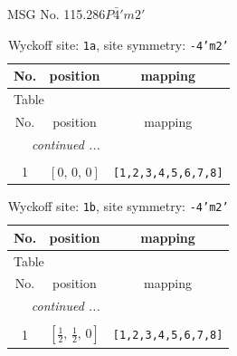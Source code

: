 \documentclass[fleqn,8pt]{jsarticle}
\begin{document}
\setcounter{MaxMatrixCols}{32}

\renewcommand{\tablename}{Table~}
\renewcommand{\figurename}{Figure~}
\begin{center}
\LARGE
MSG No. 115.286\quad$P\bar{4}'m2'$
\end{center}
\renewcommand{\arraystretch}{1.2}
\begin{longtable}{ccc}
\caption{Wyckoff site: {\tt 1a}, site symmetry: {\tt -4'm2'}}
 \\
 \hline \hline
No. & position & mapping \\ \hline \endfirsthead

\multicolumn{2}{l}{\tablename\ \thetable{}} \\
 \hline \hline
No. & position & mapping \\ \hline \endhead

 \hline \hline
\multicolumn{2}{r}{\footnotesize\it continued ...} \\ \endfoot

 \hline \hline
\multicolumn{2}{r}{} \\ \endlastfoot

1 & $\left[ 0,\, 0,\, 0 \right]$ & {\tt [1,2,3,4,5,6,7,8]} \\
\end{longtable}
\renewcommand{\arraystretch}{1.2}
\begin{longtable}{ccc}
\caption{Wyckoff site: {\tt 1b}, site symmetry: {\tt -4'm2'}}
 \\
 \hline \hline
No. & position & mapping \\ \hline \endfirsthead

\multicolumn{2}{l}{\tablename\ \thetable{}} \\
 \hline \hline
No. & position & mapping \\ \hline \endhead

 \hline \hline
\multicolumn{2}{r}{\footnotesize\it continued ...} \\ \endfoot

 \hline \hline
\multicolumn{2}{r}{} \\ \endlastfoot

1 & $\left[ \frac{1}{2},\, \frac{1}{2},\, 0 \right]$ & {\tt [1,2,3,4,5,6,7,8]} \\
\end{longtable}
\renewcommand{\arraystretch}{1.2}
\end{document}
